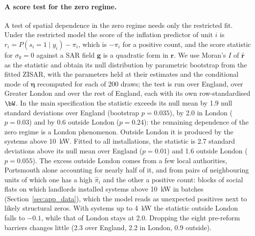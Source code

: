 \paragraph{A score test for the zero regime.}
A test of spatial dependence in the zero regime needs only the restricted fit.
Under the restricted model the score of the inflation predictor of unit $i$ is $r_i = P(s_i = 1\mid y_i) - \pi_i$, which is $-\pi_i$ for a positive count, and the score statistic for $\sigma_0 = 0$ against a SAR field $\mathbf{g}$ is a quadratic form in $\mathbf{r}$.
We use Moran's $I$ of $\hat{\mathbf{r}}$ as the statistic and obtain its null distribution by parametric bootstrap from the fitted ZISAR, with the parameters held at their estimates and the conditional mode of $\boldsymbol\eta$ recomputed for each of 200 draws; the test is run over England, over Greater London and over the rest of England, each with its own row-standardised $\bW$.
In the main specification the statistic exceeds its null mean by 1.9 null standard deviations over England (bootstrap $p = 0.035$), by 2.0 in London ($p = 0.03$) and by 0.6 outside London ($p = 0.24$): the remaining dependence of the zero regime is a London phenomenon.
Outside London it is produced by the systems above 10~kW.
Fitted to all installations, the statistic is 2.7 standard deviations above its null mean over England ($p = 0.01$) and 1.6 outside London ($p = 0.055$).
The excess outside London comes from a few local authorities, Portsmouth alone accounting for nearly half of it, and from pairs of neighbouring units of which one has a high $\hat\pi_i$ and the other a positive count: blocks of social flats on which landlords installed systems above 10~kW in batches (Section~\ref{sec:app_data}), which the model reads as unexpected positives next to likely structural zeros.
With systems up to 4~kW the statistic outside London falls to $-0.1$, while that of London stays at 2.0.
Dropping the eight pre-reform barriers changes little (2.3 over England, 2.2 in London, 0.9 outside).

